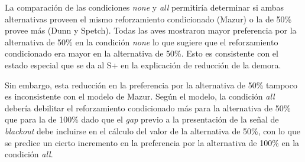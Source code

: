 \documentclass[a4paper,12pt]{article}
\begin{document}
La comparación de las condiciones {\itshape none} y {\itshape all} permitiría determinar si ambas alternativas proveen el mismo reforzamiento condicionado (Mazur) o la de 50\% provee más (Dunn y Spetch). Todas las aves mostraron mayor preferencia por la alternativa de 50\% en la condición {\itshape none} lo que sugiere que el reforzamiento condicionado era mayor en la alternativa de 50\%. Esto es consistente con el estado especial que se da al S+ en la explicación de reducción de la demora.

Sin embargo, esta reducción en la preferencia por la alternativa de 50\% tampoco es inconsistente con el modelo de Mazur. Según el modelo, la condición {\itshape all} debería debilitar el reforzamiento condicionado más para la alternativa de 50\% que para la de 100\% dado que el {\itshape gap} previo a la presentación de la señal de {\itshape blackout} debe incluirse en el cálculo del valor de la alternativa de 50\%, con lo que se predice un cierto incremento en la preferencia por la alternativa de 100\% en la condición {\itshape all}.
\end{document}

